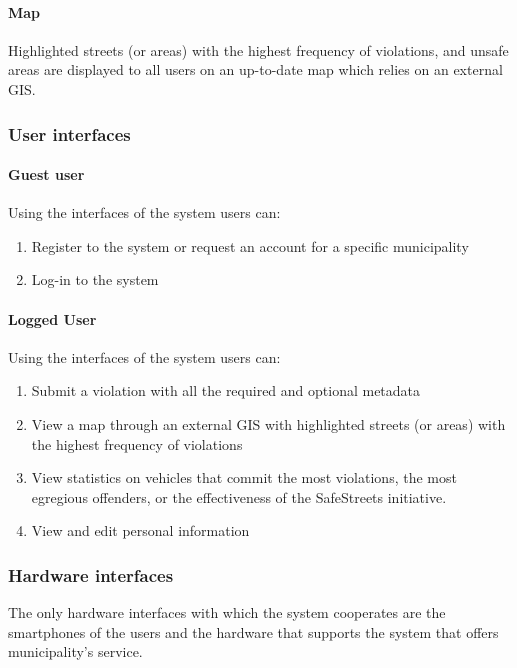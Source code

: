 	\paragraph{Map} Highlighted streets (or areas) with the highest frequency of violations, and unsafe areas are displayed to all users on an up-to-date map which relies on an external GIS.

\subsubsection{User interfaces}		
\paragraph{Guest user}
	Using the interfaces of the system users can:
	\begin{enumerate}
		\item Register to the system or request an account for a specific municipality
		\item Log-in to the system
	\end{enumerate}
\paragraph{Logged User}
	Using the interfaces of the system users can:
	\begin{enumerate}
		\item Submit a violation with all the required and optional metadata
		\item View a map through an external GIS with highlighted streets (or areas) with the highest frequency of violations
		\item View statistics on vehicles that commit the most violations, the most egregious offenders, or the effectiveness of the SafeStreets initiative.
		\item View and edit personal information
	\end{enumerate}
	
\subsubsection{Hardware interfaces}
	The only hardware interfaces with which the system cooperates are the smartphones of the users and the hardware that supports the system that offers municipality's service.
	
